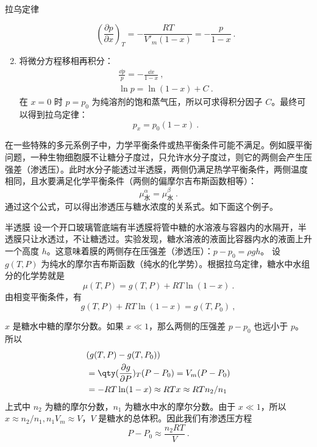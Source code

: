 \begin{example}{拉乌定律}
\begin{enumerate}
\begin{equation}
\left(\frac{\partial p}{\partial x}\right)_T=-\frac{RT}{V'_m(1-x)}=-\frac{p}{1-x}~.
\end{equation}
\item 将微分方程移相再积分：
\begin{equation}
\begin{aligned}
\frac{\dd p}{p}=-\frac{\dd x}{1-x}~,\\
\ln p=\ln(1-x)+C~.
\end{aligned}
\end{equation}
在 $x=0$ 时 $p=p_0$ 为纯溶剂的饱和蒸气压，所以可求得积分因子 $C$。最终可以得到拉乌定律：
\begin{equation}
p_x=p_0(1-x)~.
\end{equation}
\end{enumerate}
\end{example}

在一些特殊的多元系例子中，力学平衡条件或热平衡条件可能不满足。例如膜平衡问题，一种生物细胞膜不让糖分子度过，只允许水分子度过，则它的两侧会产生压强差（渗透压）。此时水分子能透过半透膜，两侧仍满足热学平衡条件，两侧温度相同，且水要满足化学平衡条件（两侧的偏摩尔吉布斯函数相等）：
\begin{equation}
\mu_\text{水}^\alpha=\mu_\text{水}^\beta~.
\end{equation}
通过这个公式，可以得出渗透压与糖水浓度的关系式。如下面这个例子。
\begin{example}{半透膜}
设一个开口玻璃管底端有半透膜将管中糖的水溶液与容器内的水隔开，半透膜只让水透过，不让糖透过。实验发现，糖水溶液的液面比容器内水的液面上升一个高度 $h$。这意味着膜的两侧存在压强差（渗透压）：$p-p_0=\rho gh$。
设 $g(T,P)$ 为纯水的摩尔吉布斯函数（纯水的化学势）。根据拉乌定律，糖水中水组分的化学势就是
\begin{equation}
\mu(T,P)=g(T,P)+RT\ln (1-x)~.
\end{equation}
由相变平衡条件，有
\begin{equation}
g(T,P)+RT\ln (1-x)=g(T,P_0)~,
\end{equation}

$x$ 是糖水中糖的摩尔分数。如果 $x\ll 1$，那么两侧的压强差 $p-p_0$ 也远小于 $p$。所以
\begin{equation}
\begin{aligned}
&(g(T,P)-g(T,P_0))\\
&=\qty(\frac{\partial g}{\partial P})_{T} (P-P_0)=V_m(P-P_0)\\
&=-RT\ln(1-x)\approx RT x\approx RT n_2/n_1
\end{aligned}
\end{equation}
上式中 $n_2$ 为糖的摩尔分数，$n_1$ 为糖水中水的摩尔分数。由于 $x\ll 1$，所以 $x\approx n_2/n_1, n_1V_m\approx V$，$V$ 是糖水的总体积。因此我们有渗透压方程
\begin{equation}
P-P_0\approx\frac{n_2RT}{V}~.
\end{equation}


\end{example}

